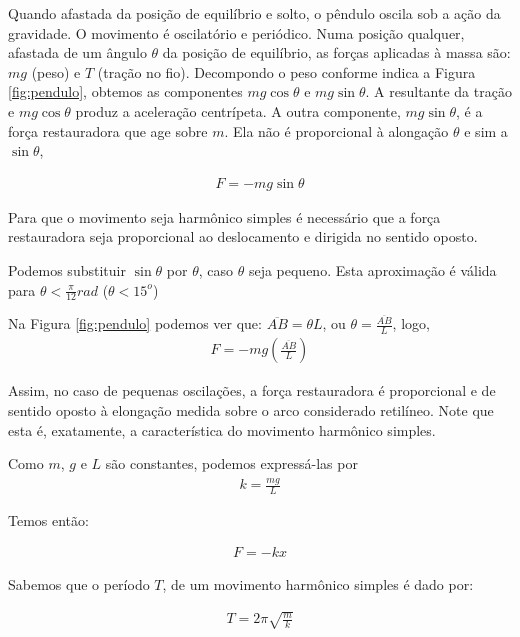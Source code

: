 \documentclass[10pt,a4paper,onecolumn,notitlepage]{scrartcl}
\begin{document}
Quando afastada da posição de equilíbrio e solto, o pêndulo oscila sob a ação da gravidade.  O movimento é oscilatório e periódico. Numa posição qualquer, afastada de um ângulo $\theta$ da posição de equilíbrio, as forças aplicadas à massa são:  $mg$ (peso)  e  $T$ (tração  no  fio). Decompondo o peso conforme indica a Figura \ref{fig:pendulo}, obtemos as componentes $mg \cos\theta$ e $mg \sin\theta$. A resultante da tração e $mg \cos\theta$  produz  a  aceleração  centrípeta.  A  outra  componente,  $mg \sin\theta$,  é  a  força  restauradora  que  age  sobre  $m$.  Ela  não  é  proporcional  à  alongação  $\theta$   e  sim  a  $\sin\theta$,

\begin{align}
F = -mg\sin\theta
\label{eq:forca-prop}
\end{align}

Para que o movimento seja harmônico simples é necessário que a força restauradora seja proporcional ao deslocamento e dirigida no sentido oposto.

Podemos substituir $\sin\theta$ por $\theta$, caso $\theta$ seja pequeno. Esta aproximação é válida para $ \theta < \frac{\pi}{12} rad$ ($\theta < 15^{o}$)

Na Figura \ref{fig:pendulo} podemos ver que: $\overline{AB} = \theta L$, ou $\theta = \frac{\overline{AB}}{L}$, logo,
\begin{align}
F = -mg(\frac{\overline{AB}}{L})
\end{align}

Assim, no caso de pequenas oscilações, a força restauradora é proporcional e de sentido oposto à elongação medida sobre o arco considerado retilíneo. Note que esta é, exatamente, a característica do movimento harmônico simples.

Como $m$, $g$ e $L$ são constantes, podemos expressá-las por
\begin{align}
k = \frac{mg}{L}
\label{eq:constanteelastica}
\end{align}

Temos então:

\begin{align}
F = -kx
\label{eq:forca}
\end{align}

Sabemos que o período $T$, de um movimento harmônico simples é dado por:

\begin{align}
T = 2\pi\sqrt{\frac{m}{k}}
\label{eq:periodo}
\end{align}
\end{document}
